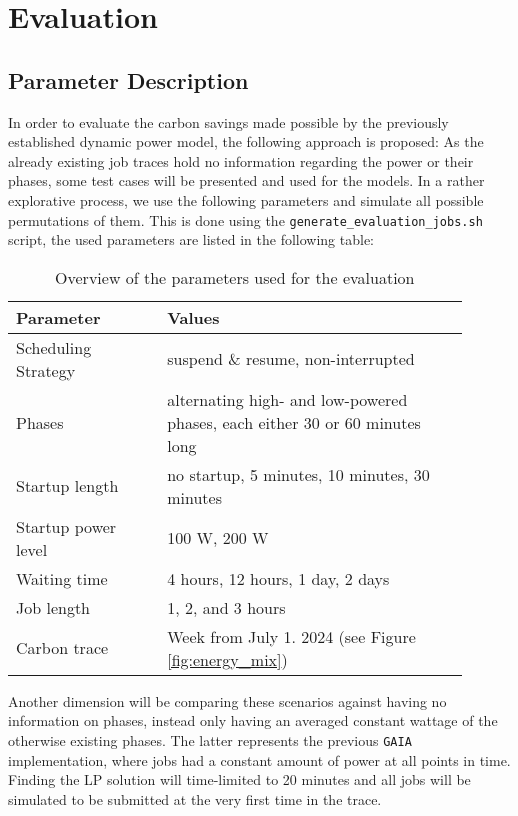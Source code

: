 \chapter{Evaluation} \label{sec:evaluate_scheduling}

\section{Parameter Description}

In order to evaluate the carbon savings made possible by the previously established dynamic power model, the following approach is proposed:
As the already existing job traces hold no information regarding the power or their phases, some test cases will be presented and used for the models.
In a rather explorative process, we use the following parameters and simulate all possible permutations of them. 
This is done using the \verb|generate_evaluation_jobs.sh| script, the used parameters are listed in the following table:

\begin{table}[h!]
    \centering
    \begin{tabular}{|p{0.3\linewidth}|p{0.6\linewidth}|}
    \hline
        Parameter & Values \\ \hline
        Scheduling Strategy & suspend \& resume, non-interrupted \\ \hline
        Phases & alternating high- and low-powered phases, each either 30 or 60 minutes long \\ \hline
        Startup length & no startup, 5 minutes, 10 minutes, 30 minutes \\ \hline
        Startup power level & 100 W, 200 W \\ \hline
        Waiting time & 4 hours, 12 hours, 1 day, 2 days \\ \hline
        Job length & 1, 2, and 3 hours \\ \hline
        Carbon trace & Week from July 1. 2024 (see Figure \ref{fig:energy_mix}) \\ \hline
    \end{tabular}
    \caption{Overview of the parameters used for the evaluation}
    \label{tab:evaluation_parameters}
    \end{table}

Another dimension will be comparing these scenarios against having no information on phases, instead only having an averaged constant wattage of the otherwise existing phases.
The latter represents the previous \verb|GAIA| implementation, where jobs had a constant amount of power at all points in time.
Finding the LP solution will time-limited to 20 minutes and all jobs will be simulated to be submitted at the very first time in the trace.

